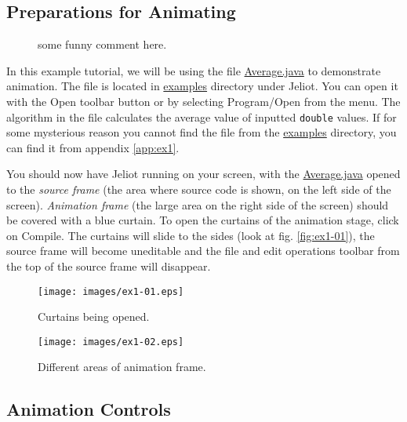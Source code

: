 \documentclass[a4paper,12pt,english]{article}
\newcommand{\jel}{Jeliot}
\newcommand{\file}{\url}
\newcommand{\p}[1]{\texttt{#1}}
\newcommand{\bu}[1]{\textsf{#1}}
\begin{document}
\subsection{Preparations for Animating}

\begin{wrapfigure}[15]{l}{50mm}
\vspace{-12pt}
some funny comment here.
\end{wrapfigure}

In this example tutorial, we will be using the file \file{Average.java} to demonstrate animation. The file is located in \file{examples} directory under \jel{}. You can open it with the \bu{Open} toolbar button or by selecting \bu{Program/Open} from the menu. The algorithm in the file calculates the average value of inputted \p{double} values. If for some mysterious reason you cannot find the file from the \file{examples} directory, you can find it from appendix \ref{app:ex1}.

You should now have \jel{} running on your screen, with the \file{Average.java} opened to the \emph{source frame} (the area where source code is shown, on the left side of the screen). \emph{Animation frame} (the large area on the right side of the screen) should be covered with a blue curtain. To open the curtains of the animation stage, click on \bu{Compile}. The curtains will slide to the sides (look at fig. \ref{fig:ex1-01}), the source frame will become uneditable and the file and edit operations toolbar from the top of the source frame will disappear.

\begin{figure}[ht]
  \begin{minipage}[t]{.49\textwidth}
    \begin{center}  
      \texttt{[image: images/ex1-01.eps]}
      \caption{\label{fig:ex1-01}Curtains being opened.}
    \end{center}
  \end{minipage}
  \hfill
  \begin{minipage}[t]{.49\textwidth}
    \begin{center}  
      \texttt{[image: images/ex1-02.eps]}
      \caption{\label{fig:ex1-02}Different areas of animation frame.}
    \end{center}
  \end{minipage}
\end{figure}

\subsection{Animation Controls}
\end{document}
